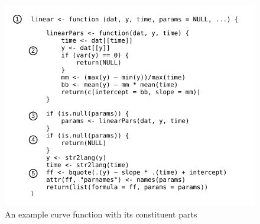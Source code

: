 \begin{figure}[H]
\centering
\includegraphics{img/fun_layout.pdf}
\caption{An example curve function with its constituent parts}
\label{fig:fun_layout}
\end{figure}

